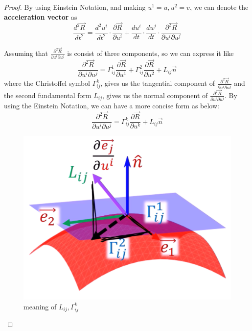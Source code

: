 \documentclass[a4paper]{article}
\theoremstyle{definition}
\theoremstyle{plain}
\begin{document}
\begin{proof}
By using Einstein Notation, and making $u^1=u, u^2=v$, we can denote the \textbf{acceleration vector} as 
\begin{equation}
    \boxed{\frac{d^2\vec{R}}{d t^2}=\frac{d^2 u^i}{d t^2}\cdot\frac{\partial \vec{R}}{\partial u^i}+\frac{du^i}{dt}\cdot\frac{du^j}{dt}\cdot\frac{\partial^2\vec{R}}{\partial u^i\partial u^j}}\label{eq10}
\end{equation}

Assuming that $\frac{\partial^2\vec{R}}{\partial u^i\partial u^j}$ is consist of three components, so we can express it like
\begin{equation*}
    \frac{\partial^2\vec{R}}{\partial u^i\partial u^j}=\Gamma_{ij}^1\frac{\partial \vec{R}}{\partial u^1}+\Gamma_{ij}^2\frac{\partial \vec{R}}{\partial u^2}+L_{ij}\vec{n}
\end{equation*}
where the Christoffel symbol $\Gamma_{ij}^k$, gives us the tangential component of $\frac{\partial^2\vec{R}}{\partial u^i\partial u^j}$ and the second fundamental form $L_{ij}$, gives us the normal component of $\frac{\partial^2\vec{R}}{\partial u^i \partial u^j}$. By using the Einstein Notation, we can have a more concise form as below:
\begin{equation}
    \boxed{\frac{\partial^2\vec{R}}{\partial u^i\partial u^j}=\Gamma_{ij}^k\frac{\partial \vec{R}}{\partial u^k}+L_{ij}\vec{n}}\label{eq9}
\end{equation}

\begin{figure}[H]
   \centering
   \includegraphics[scale=0.13]{figure/christoffel.png}
   \caption{meaning of $L_{ij},\Gamma^k_{ij}$}
\end{figure}


\end{proof}
\end{document}
